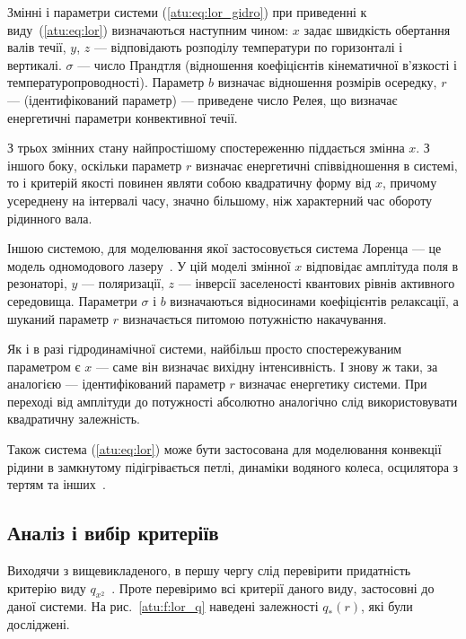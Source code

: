 Змінні і параметри системи (\ref{atu:eq:lor_gidro}) при приведенні к виду~(\ref{atu:eq:lor})
визначаються наступним чином:
$x$ задає швидкість обертання валів течії,
$y$, $z$ --- відповідають розподілу температури по горизонталі і вертикалі.
$\sigma$ --- число Прандтля (відношення коефіцієнтів кінематичної в'язкості і температуропроводності).
Параметр $b$ визначає відношення розмірів осередку,
$r$ --- (ідентифікований параметр) --- приведене число Релея, що визначає енергетичні параметри
конвективної течії.

З трьох змінних стану найпростішому спостереженню піддається змінна $x$.
З іншого боку, оскільки параметр $r$ визначає енергетичні співвідношення в
системі, то і критерій якості повинен являти собою квадратичну форму від $x$,
причому усереднену на інтервалі часу, значно більшому, ніж характерний час
обороту рідинного вала.

Іншою системою, для моделювання якої застосовується система
Лоренца --- це модель одномодового лазеру~\cite{andrianov_laser}. У цій
моделі змінної
$x$ відповідає амплітуда поля в резонаторі,
$y$ --- поляризації,
$z$ --- інверсії заселеності квантових рівнів активного середовища. Параметри
$\sigma$ і $b$ визначаються відносинами коефіцієнтів релаксації, а шуканий
параметр
$r$ визначається питомою потужністю накачування.

Як і в разі гідродинамічної системи, найбільш просто
спостережуваним параметром є
$x$ --- саме він визначає вихідну інтенсивність. І знову ж таки,
за аналогією --- ідентифікований параметр
$r$ визначає енергетику системи. При переході від амплітуди
до потужності абсолютно аналогічно слід використовувати
квадратичну залежність.

Також система (\ref{atu:eq:lor}) може бути застосована для моделювання
конвекції рідини в замкнутому підігрівається петлі, динаміки
водяного колеса, осцилятора з тертям
та інших~\cite{kuznetsov_dyn_chaos,atu_arsirii}.



\subsection{Аналіз і вибір критеріїв} %

Виходячи з вищевикладеного, в першу чергу слід перевірити придатність критерію
виду $q_{x^2}$~\cite{atu_apir2012}.
Проте перевіримо всі критерії даного виду, застосовні до
даної системи. На рис.~\ref{atu:f:lor_q} наведені залежності
$q_{*}(r)$, які були досліджені.

